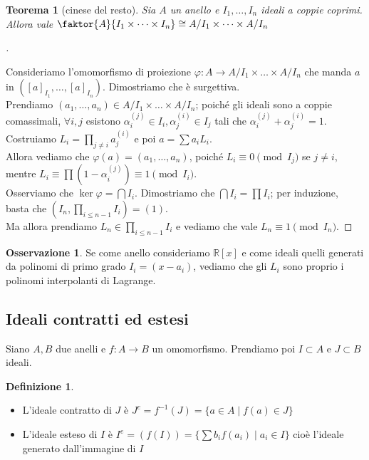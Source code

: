 \documentclass[a4paper,10pt]{article}
\theoremstyle{plain}
\newtheorem{thm}{Teorema}[section]
\theoremstyle{definition}
\newtheorem{defn}{Definizione}[section]
\newtheorem*{oss}{Osservazione}
\newenvironment{myproof}[1][\proofname]{%
  \begin{proof}[#1]$ $\par\nobreak\ignorespaces
}{%
  \qedhere
  \end{proof}
}
\newcommand{\R}{\mathbb{R}}
\begin{document}
\begin{thm}[cinese del resto]
    Sia $A$ un anello e $I_1,\dots,I_n$ ideali a coppie coprimi. Allora vale $\faktor{A}{I_1\times\dots\times I_n} \cong A/I_1 \times\dots\times A/I_n$
\end{thm}
\begin{myproof}
    Consideriamo l'omomorfismo di proiezione $\varphi: A\to A/I_1\times\dots\times A/I_n$ che manda $a$ in $([a]_{I_1},\dots,[a]_{I_n})$. Dimostriamo che è surgettiva.\\
    Prendiamo $(a_1,\dots,a_n)\in A/I_1 \times\dots\times A/I_n$; poiché gli ideali sono a coppie comassimali, $\forall i,j$ esistono $\alpha_i^{(j)}\in I_i,\alpha_j^{(i)}\in I_j$ tali che $\alpha_i^{(j)}+\alpha_j^{(i)}=1$.\\
    Costruiamo $L_i=\prod_{j\neq i}a_j^{(i)}$ e poi $a=\sum a_iL_i$.\\
    Allora vediamo che $\varphi(a)=(a_1,\dots,a_n)$, poiché $L_i\equiv0\pmod{I_j}$ se $j\neq i$, mentre $L_i\equiv\prod(1-\alpha_i^{(j)})\equiv1\pmod{I_i}$.\\
    Osserviamo che $\ker\varphi=\bigcap I_i$. Dimostriamo che $\bigcap I_i=\prod I_i$; per induzione, basta che $(I_n,\prod_{i\le n-1}I_i)=(1)$.\\
    Ma allora prendiamo $L_n\in\prod_{i\le n-1}I_i$ e vediamo che vale $L_n\equiv1\pmod{I_n}$.
\end{myproof}
\begin{oss}
    Se come anello consideriamo $\R[x]$ e come ideali quelli generati da polinomi di primo grado $I_i=(x-a_i)$, vediamo che gli $L_i$ sono proprio i polinomi interpolanti di Lagrange.
\end{oss}

\subsection{Ideali contratti ed estesi}
Siano $A,B$ due anelli e $f:A\to B$ un omomorfismo. Prendiamo poi $I\subset A$ e $J\subset B$ ideali.\\
\begin{defn}
    $ $
    \begin{itemize}
        \item L'ideale contratto di $J$ è $J^c=f^{-1}(J)=\{ a\in A\mid f(a)\in J \}$
        \item L'ideale esteso di $I$ è $I^e=(f(I))=\{ \sum b_if(a_i)\mid a_i\in I \}$ cioè l'ideale generato dall'immagine di $I$
    \end{itemize}
\end{defn}
\end{document}
